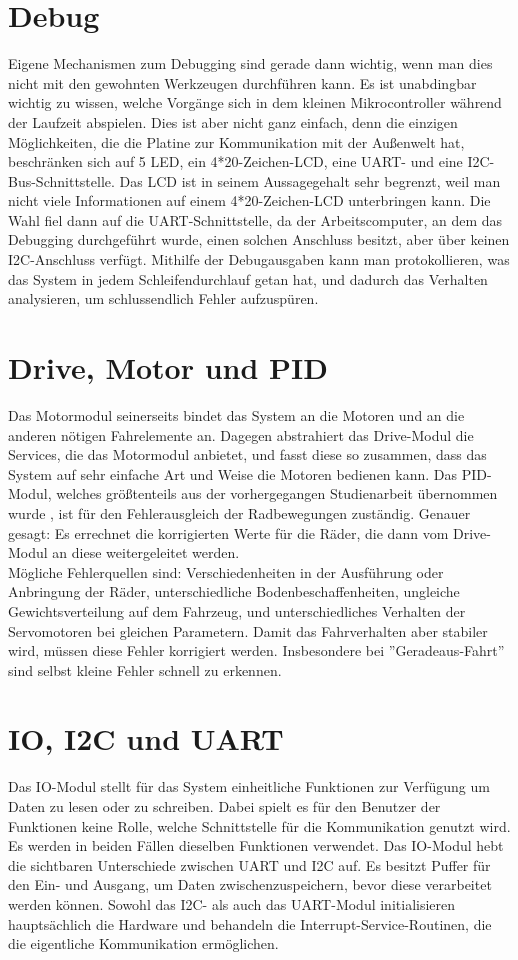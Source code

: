 \section{Debug}
Eigene Mechanismen zum Debugging sind gerade dann wichtig, wenn man dies nicht mit den
gewohnten Werkzeugen durchführen kann.
Es ist unabdingbar wichtig zu wissen, welche Vorgänge sich in dem kleinen Mikrocontroller
während der Laufzeit abspielen.
Dies ist aber nicht ganz einfach, denn die einzigen Möglichkeiten, die die Platine zur
Kommunikation mit der Außenwelt hat, beschränken sich auf
5 LED, ein 4*20-Zeichen-LCD, eine UART- und eine I2C-Bus-Schnittstelle.
Das LCD ist in seinem Aussagegehalt sehr
begrenzt, weil man nicht viele Informationen auf einem 4*20-Zeichen-LCD unterbringen kann. 
Die Wahl fiel dann auf
die UART-Schnittstelle, da der Arbeitscomputer, an dem das Debugging durchgeführt wurde,
einen solchen Anschluss besitzt, aber über keinen I2C-Anschluss verfügt.
Mithilfe der Debugausgaben kann man protokollieren, was das System in jedem
Schleifendurchlauf getan hat, und dadurch das Verhalten analysieren, um schlussendlich
Fehler aufzuspüren. 
\section{Drive, Motor und PID}
Das Motormodul seinerseits bindet das System an die Motoren und an die anderen nötigen
Fahrelemente an. Dagegen abstrahiert das Drive-Modul die Services, die das Motormodul anbietet,
und fasst diese so zusammen, dass das System auf sehr einfache Art und Weise die Motoren bedienen
kann.
Das PID-Modul, welches größtenteils aus der vorhergegangen Studienarbeit übernommen wurde
\cite{STUD_TIMO}, ist für den Fehlerausgleich der Radbewegungen zuständig. Genauer gesagt: Es
errechnet die korrigierten Werte für die Räder, die dann vom Drive-Modul an diese 
weitergeleitet werden.\\
Mögliche Fehlerquellen sind: Verschiedenheiten in der Ausführung oder Anbringung der Räder,
unterschiedliche Bodenbeschaffenheiten,
ungleiche Gewichtsverteilung auf dem Fahrzeug, und unterschiedliches Verhalten der
Servomotoren bei gleichen Parametern.
Damit das Fahrverhalten aber stabiler wird, müssen diese Fehler korrigiert werden.
Insbesondere bei ''Geradeaus-Fahrt'' sind selbst kleine Fehler schnell zu erkennen.
\section{IO, I2C und UART}
Das IO-Modul stellt für das System einheitliche Funktionen zur Verfügung um Daten zu lesen
oder zu schreiben. 
Dabei spielt es für den Benutzer der Funktionen keine Rolle, welche Schnittstelle
für die Kommunikation genutzt wird.
Es werden in beiden Fällen dieselben Funktionen verwendet.
Das IO-Modul hebt die sichtbaren Unterschiede zwischen UART und I2C auf. Es besitzt Puffer für den
Ein- und Ausgang, um Daten zwischenzuspeichern, bevor diese verarbeitet werden können.
Sowohl das I2C- als auch das UART-Modul initialisieren hauptsächlich die Hardware und
behandeln die Interrupt-Service-Routinen, die die eigentliche Kommunikation ermöglichen.
